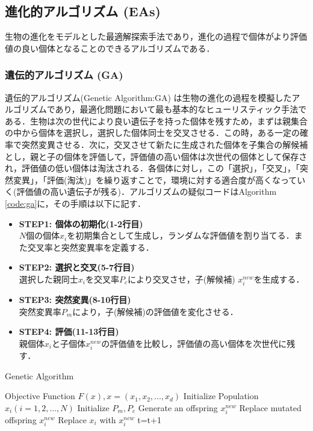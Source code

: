 \documentclass[a4j,11pt]{jarticle}
\begin{document}
\subsection{進化的アルゴリズム (EAs)}
\label{ss:EAs}
生物の進化をモデルとした最適解探索手法であり，進化の過程で個体がより評価値の良い個体となることのできるアルゴリズムである．

\subsubsection{遺伝的アルゴリズム (GA)}
\label{sss:GA}
遺伝的アルゴリズム(Genetic Algorithm:GA) \cite{GA} は生物の進化の過程を模擬したアルゴリズムであり，最適化問題において最も基本的なヒューリスティック手法である．生物は次の世代により良い遺伝子を持った個体を残すため，まずは親集合の中から個体を選択し，選択した個体同士を交叉させる．この時，ある一定の確率で突然変異させる．次に，交叉させて新たに生成された個体を子集合の解候補とし，親と子の個体を評価して，評価値の高い個体は次世代の個体として保存され，評価値の低い個体は淘汰される．各個体に対し，この「選択」，「交叉」，「突然変異」，「評価(淘汰)」を繰り返すことで，環境に対する適合度が高くなっていく(評価値の高い遺伝子が残る)．アルゴリズムの疑似コードはAlgorithm \ref{code:ga}に，その手順は以下に記す．

\begin{itemize}
\item {\bf STEP1: 個体の初期化(1-2行目)} \\
$N$個の個体$x_i$を初期集合として生成し，ランダムな評価値を割り当てる．また交叉率と突然変異率を定義する．
\item {\bf STEP2: 選択と交叉(5-7行目)} \\
選択した親同士$x_i$を交叉率$P_c$により交叉させ，子(解候補) $x_i^{new}$を生成する．
\item {\bf STEP3: 突然変異(8-10行目)} \\
突然変異率$P_m$により，子(解候補)の評価値を変化させる．
\item {\bf STEP4: 評価(11-13行目)} \\
親個体$x_i$と子個体$x_i^{new}$の評価値を比較し，評価値の高い個体を次世代に残す．
\end{itemize}

\renewcommand{\algorithmicrequire}{\textbf{Input:}}
\renewcommand{\algorithmicensure}{\textbf{Output:}}

\begin{algorithm}[H]
\caption{Genetic Algorithm}
\label{code:ga}
\begin{algorithmic}[1]
\REQUIRE Objective Function $F(x), x=(x_1,x_2,...,x_d)$
\STATE Initialize Population $x_i (i=1,2,...,N)$
\STATE Initialize $P_m, P_c$
\STATE Generate an offspring $x_i^{new}$ 
\ENDIF
{}
\STATE Replace mutated offspring $x_i^{new}$
\ENDIF
{}
\STATE Replace $x_i$ with $x_i^{new}$
\ENDIF
\ENDFOR
\STATE t=t+1
\ENDWHILE
\end{algorithmic}
\end{algorithm}
\end{document}
